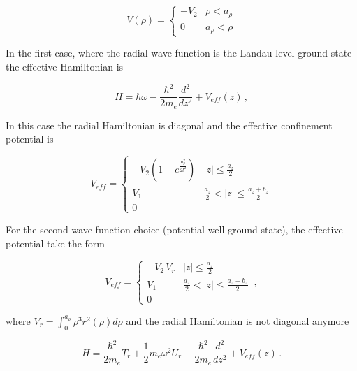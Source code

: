 \documentclass[a4paper,10pt]{article}
\begin{document}
\begin{equation}
  V(\rho) = \left\{ \begin{matrix}
                    -V_2 & \rho<a_{\rho} \\
                    0    & a_{\rho}<\rho
                    \end{matrix}\right.
\end{equation}

In the first case, where the radial wave function is the Landau level ground-state the effective Hamiltonian is

\begin{equation}
  H = \hbar \omega - \frac{\hbar^2}{2 m_e} \frac{d^2}{dz^2} + V_{eff}(z) \, ,
\end{equation}

\noindent In this case the radial Hamiltonian is diagonal and the effective confinement potential is

\begin{equation}
  V_{eff} = \left\{ \begin{matrix}
                         -V_2 \left(1 - e^{\frac{a_{\rho}^2}{2 l^2}}\right) & |z|\leq\frac{a_z}{2} \\
                         V_1  & \frac{a_z}{2}< |z| \leq \frac{a_z + b_z}{2}\\
                         0
                       \end{matrix}\right.
\end{equation}

For the second wave function choice (potential well ground-state), the
effective potential take the form

\begin{equation}
  V_{eff} = \left\{ \begin{matrix}
                         -V_2\, V_r & |z|\leq\frac{a_z}{2} \\
                         V_1  & \frac{a_z}{2}< |z| \leq \frac{a_z + b_z}{2}\\
                         0
                       \end{matrix}\right. \, ,
\end{equation}

\noindent where $V_r = \int_0^{a_{\rho}} \rho^3 r^2(\rho) d\rho$ and the radial Hamiltonian is not
diagonal anymore

\begin{equation}
  H = \frac{\hbar^2}{2 m_e} T_r + \frac{1}{2} m_e \omega^2 U_r - \frac{\hbar^2}{2 m_e} \frac{d^2}{dz^2} + V_{eff}(z) \, .
\end{equation}
\end{document}

